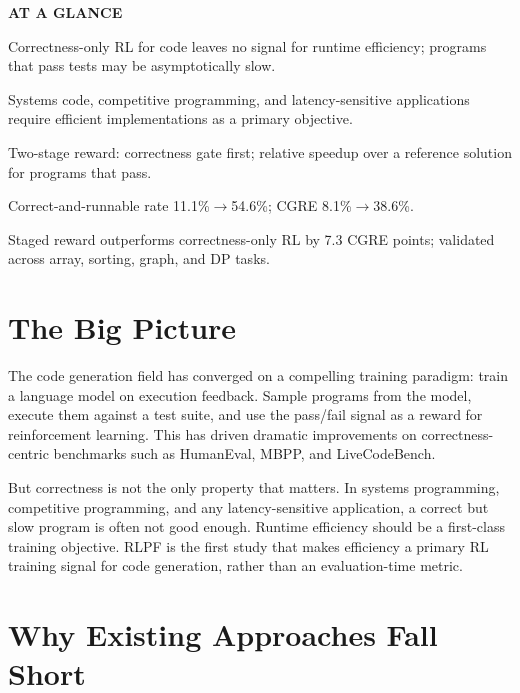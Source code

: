 \documentclass[10pt,twocolumn]{article}
\begin{document}
\begin{mdframed}[backgroundcolor=boxgray,linecolor=rulered,linewidth=1pt,
    innerleftmargin=6pt,innerrightmargin=6pt,
    innertopmargin=6pt,innerbottommargin=6pt]
\textbf{\small AT A GLANCE}\par\vspace{4pt}
\begin{description}[leftmargin=0pt,labelsep=4pt,itemsep=2pt,parsep=0pt,
    font=\small\bfseries]
  \item[Problem:] Correctness-only RL for code leaves no signal for runtime
    efficiency; programs that pass tests may be asymptotically slow.
  \item[Why it matters:] Systems code, competitive programming, and
    latency-sensitive applications require efficient implementations as a
    primary objective.
  \item[Method:] Two-stage reward: correctness gate first; relative
    speedup over a reference solution for programs that pass.
  \item[Result:] Correct-and-runnable rate 11.1\%$\to$54.6\%; CGRE
    8.1\%$\to$38.6\%.
  \item[Evidence:] Staged reward outperforms correctness-only RL by
    7.3 CGRE points; validated across array, sorting, graph, and DP tasks.
\end{description}
\end{mdframed}

\section{The Big Picture}

The code generation field has converged on a compelling training paradigm:
train a language model on execution feedback. Sample programs from the
model, execute them against a test suite, and use the pass/fail signal as
a reward for reinforcement learning. This has driven dramatic improvements
on correctness-centric benchmarks such as HumanEval, MBPP, and LiveCodeBench.

But correctness is not the only property that matters. In systems
programming, competitive programming, and any latency-sensitive application,
a correct but slow program is often not good enough. Runtime efficiency
should be a first-class training objective. RLPF is the first study that
makes efficiency a primary RL training signal for code generation, rather
than an evaluation-time metric.

\section{Why Existing Approaches Fall Short}
\end{document}
